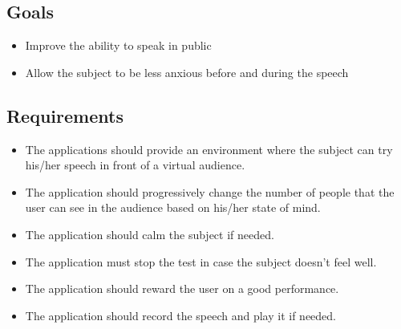 \subsection{Goals}
\begin{itemize}
	\item Improve the ability to speak in public
	\item Allow the subject to be less anxious before and during the speech
\end{itemize}

\subsection{Requirements}

\begin{itemize}
	\item The applications should provide an environment where the subject can try his/her speech in front of a virtual audience.
	\item The application should progressively change the number of people that the user can see in the audience based on his/her state of mind.
	\item The application should calm the subject if needed.
	\item The application must stop the test in case the subject doesn't feel well.
	\item The application should reward the user on a good performance.
	\item The application should record the speech and play it if needed.
\end{itemize}




